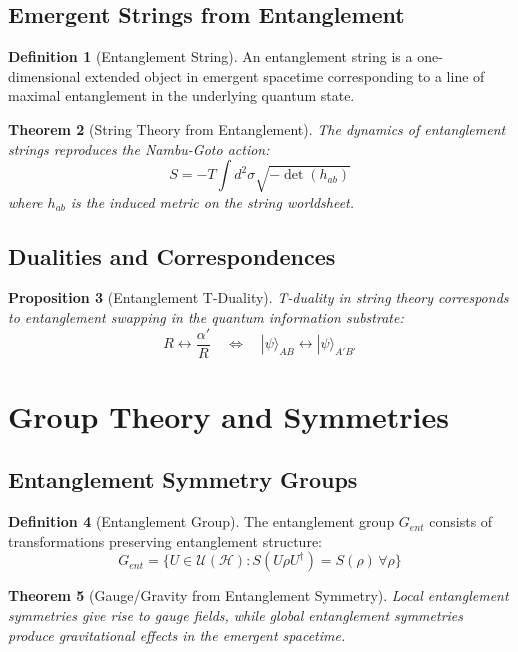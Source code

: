 \documentclass[12pt,a4paper]{article}
\newcommand{\Hilb}{\mathcal{H}}
\theoremstyle{plain}
\newtheorem{theorem}{Theorem}[section]
\newtheorem{proposition}[theorem]{Proposition}
\theoremstyle{definition}
\newtheorem{definition}[theorem]{Definition}
\theoremstyle{remark}
\begin{document}
\subsection{Emergent Strings from Entanglement}

\begin{definition}[Entanglement String]
An entanglement string is a one-dimensional extended object in emergent spacetime corresponding to a line of maximal entanglement in the underlying quantum state.
\end{definition}

\begin{theorem}[String Theory from Entanglement]
The dynamics of entanglement strings reproduces the Nambu-Goto action:
\[S = -T \int d^2\sigma \sqrt{-\det(h_{ab})}\]
where $h_{ab}$ is the induced metric on the string worldsheet.
\end{theorem}

\subsection{Dualities and Correspondences}

\begin{proposition}[Entanglement T-Duality]
T-duality in string theory corresponds to entanglement swapping in the quantum information substrate:
\[R \leftrightarrow \frac{\alpha'}{R} \quad \Leftrightarrow \quad |\psi\rangle_{AB} \leftrightarrow |\psi\rangle_{A'B'}\]
\end{proposition}

\section{Group Theory and Symmetries}

\subsection{Entanglement Symmetry Groups}

\begin{definition}[Entanglement Group]
The entanglement group $G_{ent}$ consists of transformations preserving entanglement structure:
\[G_{ent} = \{U \in \mathcal{U}(\Hilb) : S(U\rho U^\dagger) = S(\rho) \, \forall \rho\}\]
\end{definition}

\begin{theorem}[Gauge/Gravity from Entanglement Symmetry]
Local entanglement symmetries give rise to gauge fields, while global entanglement symmetries produce gravitational effects in the emergent spacetime.
\end{theorem}
\end{document}
